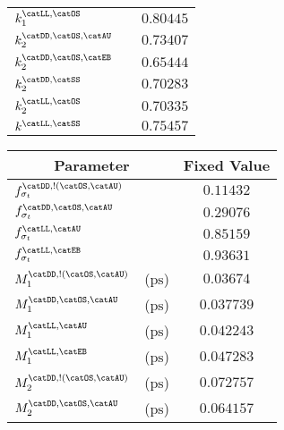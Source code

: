 \begin{table}[h]
\begin{tabular}[t]{llr@{$\,\pm\,$}l}
  $k_1^\text{\catLL,\catOS}$                 &                       & \multicolumn{2}{c}{$0.80445$}\\
  $k_2^\text{\catDD,\catOS,\catAU}$          &                       & \multicolumn{2}{c}{$0.73407$}\\
  $k_2^\text{\catDD,\catOS,\catEB}$          &                       & \multicolumn{2}{c}{$0.65444$}\\
  $k_2^\text{\catDD,\catSS}$                 &                       & \multicolumn{2}{c}{$0.70283$}\\
  $k_2^\text{\catLL,\catOS}$                 &                       & \multicolumn{2}{c}{$0.70335$}\\
  $k^\text{\catLL,\catSS}$                   &                       & \multicolumn{2}{c}{$0.75457$}\\
  \bottomrule
\end{tabular}
%
\quad
%
\begin{tabular}[t]{llr@{$\,\pm\,$}l}
  \toprule
  \multicolumn{2}{c}{Parameter}                  & \multicolumn{2}{c}{Fixed Value} \\
  \midrule
  $f_{\sigma_t}^\text{\catDD,!(\catOS,\catAU)}$  &                       & \multicolumn{2}{c}{$0.11432$}\\
  $f_{\sigma_t}^\text{\catDD,\catOS,\catAU}$     &                       & \multicolumn{2}{c}{$0.29076$}\\
  $f_{\sigma_t}^\text{\catLL,\catAU}$            &                       & \multicolumn{2}{c}{$0.85159$}\\
  $f_{\sigma_t}^\text{\catLL,\catEB}$            &                       & \multicolumn{2}{c}{$0.93631$}\\
  $M_1^\text{\catDD,!(\catOS,\catAU)}$           & ($\si{\pico\second}$) & \multicolumn{2}{c}{$0.03674$}\\
  $M_1^\text{\catDD,\catOS,\catAU}$              & ($\si{\pico\second}$) & \multicolumn{2}{c}{$0.037739$}\\
  $M_1^\text{\catLL,\catAU}$                     & ($\si{\pico\second}$) & \multicolumn{2}{c}{$0.042243$}\\
  $M_1^\text{\catLL,\catEB}$                     & ($\si{\pico\second}$) & \multicolumn{2}{c}{$0.047283$}\\
  $M_2^\text{\catDD,!(\catOS,\catAU)}$           & ($\si{\pico\second}$) & \multicolumn{2}{c}{$0.072757$}\\
  $M_2^\text{\catDD,\catOS,\catAU}$              & ($\si{\pico\second}$) & \multicolumn{2}{c}{$0.064157$}\\

\end{tabular}
\end{table}
